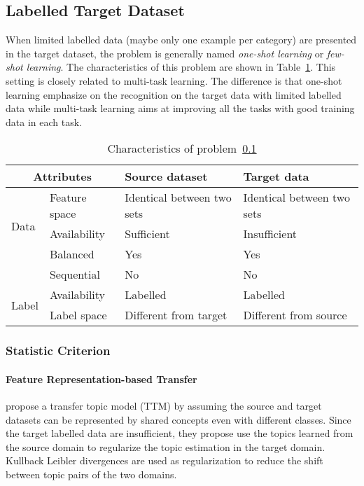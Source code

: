 \documentclass[prodmode]{acmsmall}  %
\begin{document}
\subsection{Labelled Target Dataset}
\label{sec:HETELsup}
When limited labelled data (maybe only one example per category) are presented in the target dataset, the problem is generally named \textit{one-shot learning} or \textit{few-shot learning}. The characteristics of this problem are shown in Table~\ref{tab:HETELsup}. This setting is closely related to multi-task learning. The difference is that one-shot learning emphasize on the recognition on the target data with limited labelled data while multi-task learning aims at improving all the tasks with good training data in each task.
\begin{table}[htbp!]
\caption{Characteristics of problem~\ref{sec:HETELsup}}
\label{tab:HETELsup}
\begin{center}
\begin{small}
\begin{tabular}{|p{1cm}<{\centering}|m{2.5cm}<{\centering}|m{4.3cm}<{\centering}|m{4.3cm}<{\centering}|}
\hline
\multicolumn{2}{|c|}{Attributes} & Source dataset & Target data \\
\hline \hline
\multirow{3}{*}{Data} & Feature space & Identical between two sets & Identical between two sets \\ 
\cline{2-4}{} & Availability & Sufficient & {\color{red}Insufficient} \\
\cline{2-4}{} & Balanced & Yes & Yes\\
\cline{2-4}{} & Sequential & No & No \\
\hline \hline
\multirow{2}{*}{Label} & Availability & Labelled & Labelled \\
\cline{2-4}{}  & Label space & Different from target & {\color{red}Different from source} \\ 
\hline
\end{tabular}
\end{small}
\end{center}
\end{table}
\subsubsection{Statistic Criterion}
\paragraph{Feature Representation-based Transfer}
 propose a transfer topic model (TTM) by assuming the source and target datasets can be represented by shared concepts even with different classes. Since the target labelled data are insufficient, they propose use the topics learned from the source domain to regularize the topic estimation in the target domain. Kullback Leibler divergences are used as regularization to reduce the shift between topic pairs of the two domains.
\end{document}
